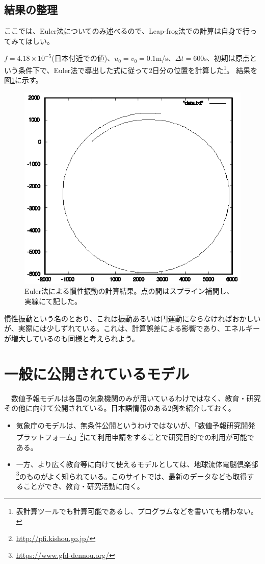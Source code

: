 \documentclass{jsarticle}
\begin{document}
\subsection{結果の整理}
ここでは、Euler法についてのみ述べるので、Leap-frog法での計算は自身で行ってみてほしい。

$f=4.18\times 10^{-5}$(日本付近での値)、$u_0=v_0=0.1$m/s、$\Delta t=600$s、初期は原点という条件下で、Euler法で導出した式に従って2日分の位置を計算した\footnote{表計算ツールでも計算可能であるし、プログラムなどを書いても構わない。}。
結果を図\ref{Euler}に示す。

\begin{figure}[ht]
\centering
\includegraphics[width=0.6\linewidth,clip,keepaspectratio]{Euler.eps}
\caption{Euler法による慣性振動の計算結果。点の間はスプライン補間し、実線にて記した。}\label{Euler}
\end{figure}

慣性振動という名のとおり、これは振動あるいは円運動にならなければおかしいが、実際には少しずれている。これは、計算誤差による影響であり、エネルギーが増大しているのも同様と考えられよう。


\section{一般に公開されているモデル}
　数値予報モデルは各国の気象機関のみが用いているわけではなく、教育・研究その他に向けて公開されている。日本語情報のある2例を紹介しておく。

\begin{itemize}
\item 気象庁のモデルは、無条件公開というわけではないが、「数値予報研究開発プラットフォーム」\footnote{\url{http://pfi.kishou.go.jp/}}にて利用申請をすることで研究目的での利用が可能である。
\item 一方、より広く教育等に向けて使えるモデルとしては、地球流体電脳倶楽部\footnote{\url{https://www.gfd-dennou.org/}}のものがよく知られている。このサイトでは、最新のデータなども取得することができ、教育・研究活動に向く。
\end{itemize}
\end{document}
